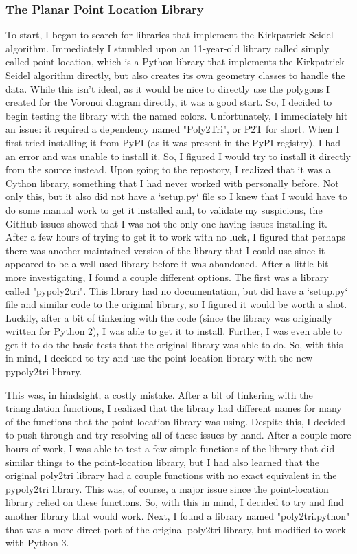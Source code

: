 \documentclass{article}
\begin{document}
\subsubsection{The Planar Point Location Library}
To start, I began to search for libraries that implement the Kirkpatrick-Seidel
algorithm. Immediately I stumbled upon an 11-year-old library called simply called point-location\cite{pointLocation},
which is a Python library that implements the Kirkpatrick-Seidel algorithm directly, but
also creates its own geometry classes to handle the data. While this isn't ideal, as it
would be nice to directly use the polygons I created for the Voronoi diagram directly,
it was a good start. So, I decided to begin testing the library with the named colors.
Unfortunately, I immediately hit an issue: it required a dependency named
"Poly2Tri", or P2T for short. When I first tried installing it from PyPI (as it was present in
the PyPI registry), I had an error and was unable to install it. So, I figured I would try to
install it directly from the source instead. Upon going to the repostory, I realized that it was 
a Cython library, something that I had never worked with personally before. Not only this, but it
also did not have a `setup.py` file so I knew that I would have to do some manual work to get it 
installed and, to validate my suspicions, the GitHub issues showed that I was not the only one having issues installing it. After a few hours of trying to get it to work with no luck, I figured that perhaps there
was another maintained version of the library that I could use since it appeared to be a well-used
library before it was abandoned. After a little bit more investigating, I found a couple different options.
The first was a library called "pypoly2tri". This library had no documentation, but did have a `setup.py`
file and similar code to the original library, so I figured it would be worth a shot. Luckily, after a bit
of tinkering with the code (since the library was originally written for Python 2), I was able to get it to
install. Further, I was even able to get it to do the basic tests that the original library was able to do.
So, with this in mind, I decided to try and use the point-location library with the new pypoly2tri library.
\newline

\noindent
This was, in hindsight, a costly mistake. After a bit of tinkering with the
triangulation functions, I realized that the library had different names for 
many of the functions that the point-location library was using. Despite this,
I decided to push through and try resolving all of these issues by hand. After 
a couple more hours of work, I was able to test a few simple functions of the library
that did similar things to the point-location library, but I had also learned that 
the original poly2tri library had a couple functions with no exact equivalent in the
pypoly2tri library. This was, of course, a major issue since the point-location library
relied on these functions. So, with this in mind, I decided to try and find another library
that would work. Next, I found a library named "poly2tri.python" that was a more direct port
of the original poly2tri library, but modified to work with Python 3.
\newline
\end{document}
